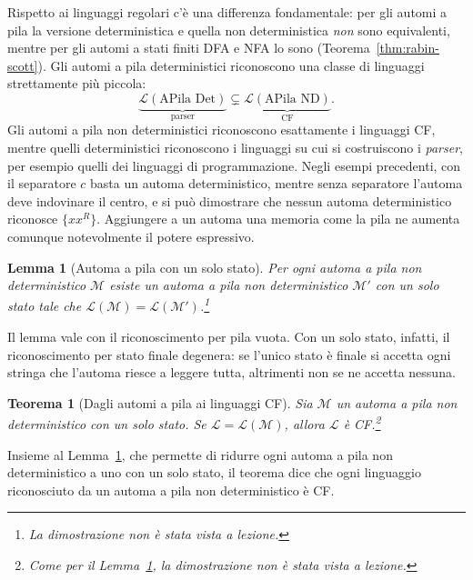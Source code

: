 \documentclass[a4paper, 11pt, oneside]{book}
\theoremstyle{formale}
\newtheorem{theorem}{Teorema}
\newtheorem{lemma}{Lemma}
\begin{document}
    Rispetto ai linguaggi regolari c'\`e una differenza fondamentale: per gli automi a
    pila la versione deterministica e quella non deterministica \emph{non} sono
    equivalenti, mentre per gli automi a stati finiti DFA e NFA lo sono
    (Teorema~\ref{thm:rabin-scott}). Gli automi a pila deterministici riconoscono una
    classe di linguaggi strettamente pi\`u piccola:
    \begin{equation*}
        \underbrace{\mathcal{L}(\text{APila Det})}_{\text{parser}}
        \subsetneq
        \underbrace{\mathcal{L}(\text{APila ND})}_{\text{CF}}.
    \end{equation*}
    Gli automi a pila non deterministici riconoscono esattamente i linguaggi CF, mentre
    quelli deterministici riconoscono i linguaggi su cui si costruiscono i \emph{parser},
    per esempio quelli dei linguaggi di programmazione. Negli esempi precedenti, con il
    separatore $c$ basta un automa deterministico, mentre senza separatore l'automa
    deve indovinare il centro, e si pu\`o dimostrare che nessun automa deterministico
    riconosce $\{x x^R\}$. Aggiungere a un automa una memoria come la pila ne aumenta
    comunque notevolmente il potere espressivo.

    \begin{lemma}[Automa a pila con un solo stato]
        \label{lem:pila-uno-stato}
        Per ogni automa a pila non deterministico $\mathcal{M}$ esiste un automa a pila
        non deterministico $\mathcal{M}'$ con un solo stato tale che
        $\mathcal{L}(\mathcal{M}) = \mathcal{L}(\mathcal{M}')$.\footnote{La
        dimostrazione non \`e stata vista a lezione.}
    \end{lemma}
    Il lemma vale con il riconoscimento per pila vuota. Con un solo stato, infatti, il
    riconoscimento per stato finale degenera: se l'unico stato \`e finale si accetta ogni
    stringa che l'automa riesce a leggere tutta, altrimenti non se ne accetta nessuna.

    \begin{theorem}[Dagli automi a pila ai linguaggi CF]
        \label{thm:pila-cf}
        Sia $\mathcal{M}$ un automa a pila non deterministico con un solo stato. Se
        $\mathcal{L} = \mathcal{L}(\mathcal{M})$, allora $\mathcal{L}$ \`e
        CF.\footnote{Come per il Lemma~\ref{lem:pila-uno-stato}, la dimostrazione non
        \`e stata vista a lezione.}
    \end{theorem}
    Insieme al Lemma~\ref{lem:pila-uno-stato}, che permette di ridurre ogni automa a
    pila non deterministico a uno con un solo stato, il teorema dice che ogni linguaggio
    riconosciuto da un automa a pila non deterministico \`e CF.
\end{document}

